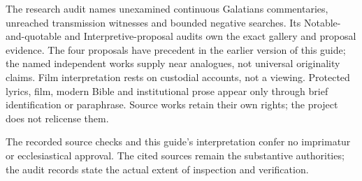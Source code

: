 The research audit names unexamined continuous Galatians commentaries,
unreached transmission witnesses and bounded negative searches. Its
Notable-and-quotable and Interpretive-proposal audits own the exact gallery
and proposal evidence. The four proposals have precedent in the earlier
version of this guide; the named independent works supply near analogues,
not universal originality claims. Film interpretation rests on custodial
accounts, not a viewing. Protected lyrics, film, modern Bible and
institutional prose appear only through brief identification or paraphrase.
Source works retain their own rights; the project does not relicense them.

The recorded source checks and this guide's interpretation confer no
imprimatur or ecclesiastical approval. The cited sources remain the
substantive authorities; the audit records state the actual extent of
inspection and verification.
